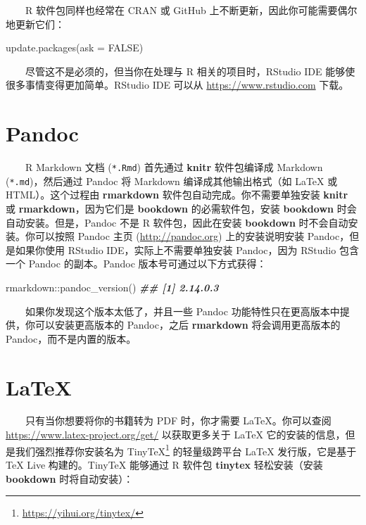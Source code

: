 \documentclass[
  12pt,
]{krantz}
\newenvironment{Shaded}{\begin{snugshade}}{\end{snugshade}}
\newcommand{\AttributeTok}[1]{\textcolor[rgb]{0.77,0.63,0.00}{#1}}
\newcommand{\ConstantTok}[1]{\textcolor[rgb]{0.00,0.00,0.00}{#1}}
\newcommand{\DocumentationTok}[1]{\textcolor[rgb]{0.56,0.35,0.01}{\textbf{\textit{#1}}}}
\newcommand{\FunctionTok}[1]{\textcolor[rgb]{0.00,0.00,0.00}{#1}}
\newcommand{\NormalTok}[1]{#1}
\newcommand{\SpecialCharTok}[1]{\textcolor[rgb]{0.00,0.00,0.00}{#1}}
\renewcommand{\href}[2]{#2\footnote{\url{#1}}}
\theoremstyle{definition}
\theoremstyle{definition}
\theoremstyle{definition}
\theoremstyle{definition}
\theoremstyle{remark}
\begin{document}
  R 软件包同样也经常在 CRAN 或 GitHub 上不断更新，因此你可能需要偶尔地更新它们：

\begin{Shaded}
\begin{Highlighting}[]
\FunctionTok{update.packages}\NormalTok{(}\AttributeTok{ask =} \ConstantTok{FALSE}\NormalTok{)}
\end{Highlighting}
\end{Shaded}

  尽管这不是必须的，但当你在处理与 R 相关的项目时，RStudio IDE 能够使很多事情变得更加简单。RStudio IDE 可以从 \url{https://www.rstudio.com} 下载。

\hypertarget{pandoc}{%
\section{Pandoc}\label{pandoc}}

  R Markdown 文档 (\texttt{*.Rmd}) 首先通过 \textbf{knitr} 软件包编译成 Markdown (\texttt{*.md})，然后通过 Pandoc 将 Markdown 编译成其他输出格式（如 LaTeX 或 HTML）。这个过程由 \textbf{rmarkdown} 软件包自动完成。你不需要单独安装 \textbf{knitr} 或 \textbf{rmarkdown}，因为它们是 \textbf{bookdown} 的必需软件包，安装 \textbf{bookdown} 时会自动安装。但是，Pandoc 不是 R 软件包，因此在安装 \textbf{bookdown} 时不会自动安装。你可以按照 Pandoc 主页 (\url{http://pandoc.org}) 上的安装说明安装 Pandoc，但是如果你使用 RStudio IDE，实际上不需要单独安装 Pandoc，因为 RStudio 包含一个 Pandoc 的副本。Pandoc 版本号可通过以下方式获得：

\begin{Shaded}
\begin{Highlighting}[]
\NormalTok{rmarkdown}\SpecialCharTok{::}\FunctionTok{pandoc\_version}\NormalTok{()}
\DocumentationTok{\#\# [1] \textquotesingle{}2.14.0.3\textquotesingle{}}
\end{Highlighting}
\end{Shaded}

  如果你发现这个版本太低了，并且一些 Pandoc 功能特性只在更高版本中提供，你可以安装更高版本的 Pandoc，之后 \textbf{rmarkdown} 将会调用更高版本的 Pandoc，而不是内置的版本。

\hypertarget{latex}{%
\section{LaTeX}\label{latex}}

  只有当你想要将你的书籍转为 PDF 时，你才需要 LaTeX。你可以查阅 \url{https://www.latex-project.org/get/} 以获取更多关于 LaTeX 它的安装的信息，但是我们强烈推荐你安装名为 \href{https://yihui.org/tinytex/}{TinyTeX} 的轻量级跨平台 LaTeX 发行版，它是基于 TeX Live 构建的。TinyTeX 能够通过 R 软件包 \textbf{tinytex} 轻松安装（安装 \textbf{bookdown} 时将自动安装）：
\end{document}

